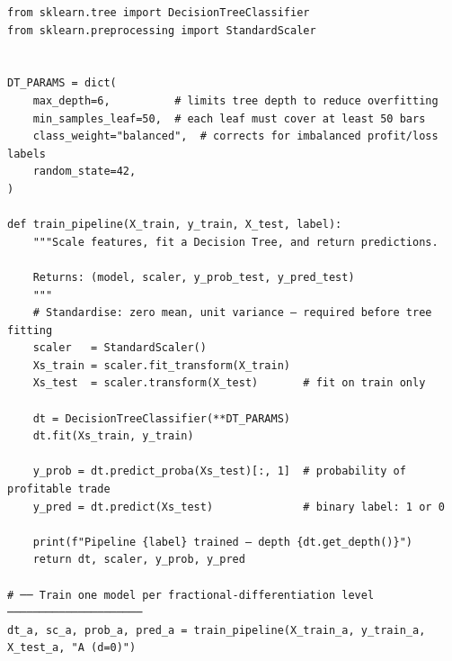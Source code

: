 %
%

\begin{listing}[ht]
\begin{verbatim}
from sklearn.tree import DecisionTreeClassifier
from sklearn.preprocessing import StandardScaler


DT_PARAMS = dict(
    max_depth=6,          # limits tree depth to reduce overfitting
    min_samples_leaf=50,  # each leaf must cover at least 50 bars
    class_weight="balanced",  # corrects for imbalanced profit/loss labels
    random_state=42,
)

def train_pipeline(X_train, y_train, X_test, label):
    """Scale features, fit a Decision Tree, and return predictions.

    Returns: (model, scaler, y_prob_test, y_pred_test)
    """
    # Standardise: zero mean, unit variance — required before tree fitting
    scaler   = StandardScaler()
    Xs_train = scaler.fit_transform(X_train)
    Xs_test  = scaler.transform(X_test)       # fit on train only

    dt = DecisionTreeClassifier(**DT_PARAMS)
    dt.fit(Xs_train, y_train)

    y_prob = dt.predict_proba(Xs_test)[:, 1]  # probability of profitable trade
    y_pred = dt.predict(Xs_test)              # binary label: 1 or 0

    print(f"Pipeline {label} trained — depth {dt.get_depth()}")
    return dt, scaler, y_prob, y_pred

# ── Train one model per fractional-differentiation level ─────────────────────
dt_a, sc_a, prob_a, pred_a = train_pipeline(X_train_a, y_train_a, X_test_a, "A (d=0)")
\end{verbatim}
\caption{%
  Training a decision tree on the financial feature matrix.
  A \texttt{StandardScaler} normalises each feature column before fitting
  (note that \texttt{transform} is called on the test set using parameters
  learned from the training set only, avoiding data leakage).
  Three separate models are trained across the three fractional-differentiation
  levels from the FeatureShootout dataset: $d=0$ (raw prices), $d=1$ (standard
  returns), and $d=x$ (optimal fractional value).
  The \texttt{class\_weight="balanced"} parameter compensates for imbalanced
  profit/loss labels --- a direct application of the pitfall described in
  Section~\ref{sec:pitfalls}.%
}
\label{lst:train-pipeline}
\end{listing}